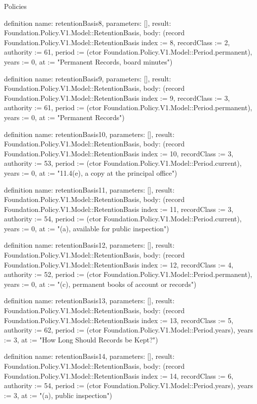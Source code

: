 \begin{lexlean}{Policies}
\begin{semanticmodule}
definition{
  name: retentionBasis8,
  parameters: [],
  result: Foundation.Policy.V1.Model::RetentionBasis,
  body: (record Foundation.Policy.V1.Model::RetentionBasis {index := 8, recordClass := 2, authority := 61, period := (ctor Foundation.Policy.V1.Model::Period.permanent), years := 0, at := "Permanent Records, board minutes"})
}

definition{
  name: retentionBasis9,
  parameters: [],
  result: Foundation.Policy.V1.Model::RetentionBasis,
  body: (record Foundation.Policy.V1.Model::RetentionBasis {index := 9, recordClass := 3, authority := 61, period := (ctor Foundation.Policy.V1.Model::Period.permanent), years := 0, at := "Permanent Records"})
}

definition{
  name: retentionBasis10,
  parameters: [],
  result: Foundation.Policy.V1.Model::RetentionBasis,
  body: (record Foundation.Policy.V1.Model::RetentionBasis {index := 10, recordClass := 3, authority := 53, period := (ctor Foundation.Policy.V1.Model::Period.current), years := 0, at := "11.4(e), a copy at the principal office"})
}

definition{
  name: retentionBasis11,
  parameters: [],
  result: Foundation.Policy.V1.Model::RetentionBasis,
  body: (record Foundation.Policy.V1.Model::RetentionBasis {index := 11, recordClass := 3, authority := 54, period := (ctor Foundation.Policy.V1.Model::Period.current), years := 0, at := "(a), available for public inspection"})
}

definition{
  name: retentionBasis12,
  parameters: [],
  result: Foundation.Policy.V1.Model::RetentionBasis,
  body: (record Foundation.Policy.V1.Model::RetentionBasis {index := 12, recordClass := 4, authority := 52, period := (ctor Foundation.Policy.V1.Model::Period.permanent), years := 0, at := "(c), permanent books of account or records"})
}

definition{
  name: retentionBasis13,
  parameters: [],
  result: Foundation.Policy.V1.Model::RetentionBasis,
  body: (record Foundation.Policy.V1.Model::RetentionBasis {index := 13, recordClass := 5, authority := 62, period := (ctor Foundation.Policy.V1.Model::Period.years), years := 3, at := "How Long Should Records be Kept?"})
}

definition{
  name: retentionBasis14,
  parameters: [],
  result: Foundation.Policy.V1.Model::RetentionBasis,
  body: (record Foundation.Policy.V1.Model::RetentionBasis {index := 14, recordClass := 6, authority := 54, period := (ctor Foundation.Policy.V1.Model::Period.years), years := 3, at := "(a), public inspection"})
}


\end{semanticmodule}
\end{lexlean}
